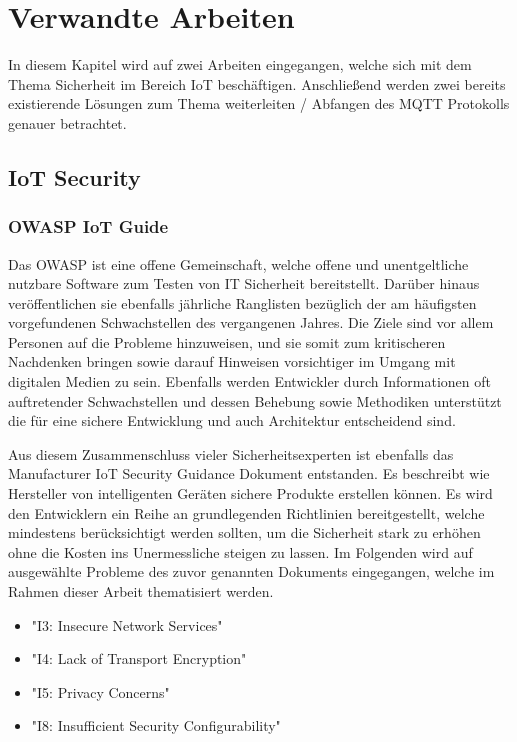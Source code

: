 \chapter{Verwandte Arbeiten}
In diesem Kapitel wird auf zwei Arbeiten eingegangen, welche sich mit dem Thema Sicherheit im Bereich \ac{IoT} beschäftigen. Anschließend werden zwei bereits existierende Lösungen zum Thema weiterleiten / Abfangen des \ac{MQTT} Protokolls genauer betrachtet.

\section{IoT Security}
    \subsection{OWASP IoT Guide}
    Das \ac{OWASP} ist eine offene Gemeinschaft, welche offene und unentgeltliche nutzbare Software zum Testen von IT Sicherheit bereitstellt. Darüber hinaus veröffentlichen sie ebenfalls jährliche Ranglisten bezüglich der am häufigsten vorgefundenen Schwachstellen des vergangenen Jahres. Die Ziele sind vor allem Personen auf die Probleme hinzuweisen, und sie somit zum kritischeren Nachdenken bringen sowie darauf Hinweisen vorsichtiger im Umgang mit digitalen Medien zu sein. Ebenfalls werden Entwickler durch Informationen oft auftretender Schwachstellen und dessen Behebung sowie Methodiken unterstützt die für eine sichere Entwicklung und auch Architektur entscheidend sind.
    
    Aus diesem Zusammenschluss vieler Sicherheitsexperten ist ebenfalls das Manufacturer \ac{IoT} Security Guidance Dokument entstanden. Es beschreibt wie Hersteller von intelligenten Geräten sichere Produkte erstellen können. Es wird den Entwicklern ein Reihe an grundlegenden Richtlinien bereitgestellt, welche mindestens berücksichtigt werden sollten, um die Sicherheit stark zu erhöhen ohne die Kosten ins Unermessliche steigen zu lassen. %
    Im Folgenden wird auf ausgewählte Probleme des zuvor genannten Dokuments eingegangen, welche im Rahmen dieser Arbeit thematisiert werden.
    \begin{itemize}
        \item "I3: Insecure Network Services"
        \item "I4: Lack of Transport Encryption"
        \item "I5: Privacy Concerns"
        \item "I8: Insufficient Security Configurability"
    \end{itemize}
    
